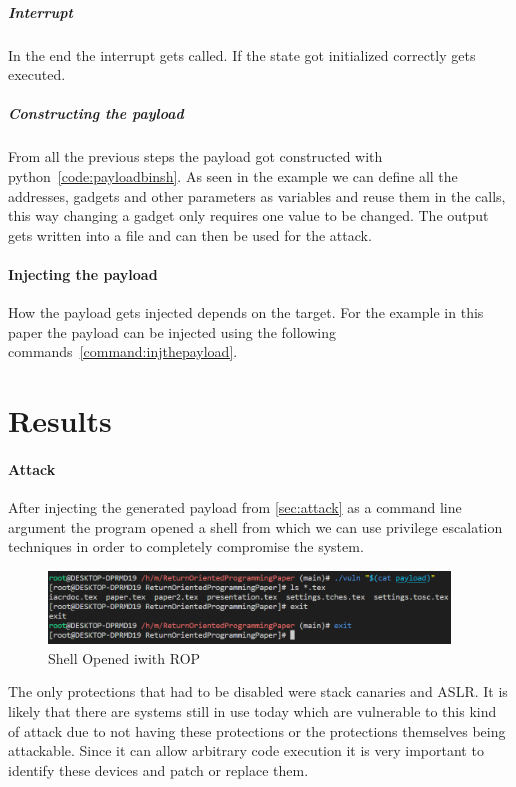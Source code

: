 \documentclass[journal=tosc,submission, notanonymous]{iacrtrans}
\begin{document}
\subparagraph{Interrupt}
In the end the  interrupt gets called. If the state got initialized correctly  gets executed.
\subparagraph{Constructing the payload}
From all the previous steps the payload got constructed with python~\cref{code:payloadbinsh}. As seen in the example we can define all the addresses, gadgets and other parameters as variables and reuse them in the  calls, this way changing a gadget only requires one value to be changed. The output gets written into a file and can then be used for the attack.
\paragraph{Injecting the payload}
\label{par:injthepayload}
How the payload gets injected depends on the target. For the example in this paper the payload can be injected using the following commands~\cref{command:injthepayload}.
\section{Results}
\paragraph{Attack}
After injecting the generated payload from \cref{sec:attack} as a command line argument the program opened a shell from which we can use privilege escalation techniques in order to completely compromise the system.
\begin{figure}[h]
  \centering
  \includegraphics[width=0.95\textwidth]{ROPdone.png}
  \caption{Shell Opened iwith ROP}
  \label{fig:success}
\end{figure}
The only protections that had to be disabled were stack canaries and ASLR. It is likely that there are systems still in use today which are vulnerable to this kind of attack due to not having these protections or the protections themselves being attackable. Since it can allow arbitrary code execution it is very important to identify these devices and patch or replace them.
\end{document}
